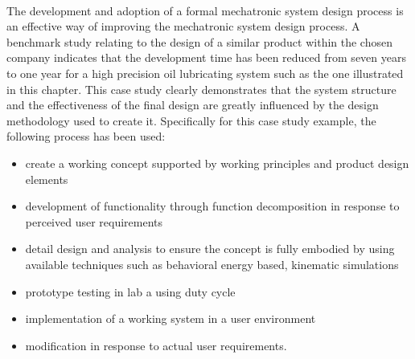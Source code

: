 \documentclass[a4paper,12pt,twoside]{report}
\begin{document}
{		\paragraph{}{\cite{AMechatronicDesignProcessAndItsApplication:Xiu2010}The development and adoption of a formal mechatronic system design process is an effective way of improving the mechatronic system design process. A benchmark study relating to the design of a similar product within the chosen company indicates that the development time has been reduced from seven years to one year for a high precision oil lubricating system such as the one illustrated in this chapter. This case study clearly demonstrates that the system structure and the effectiveness of the final design are greatly influenced by the design methodology used to create it. Specifically for this case study example, the following process has been used:
		\begin{itemize}
			\item create a working concept supported by working principles and product design elements
			\item development of functionality through function decomposition in response to perceived user requirements
			\item detail design and analysis to ensure the concept is fully embodied by using available techniques such as behavioral energy based, kinematic simulations
			\item prototype testing in lab a using duty cycle
			\item implementation of a working system in a user environment
			\item modification in response to actual user requirements.
		\end{itemize}
		}

}
\end{document}
